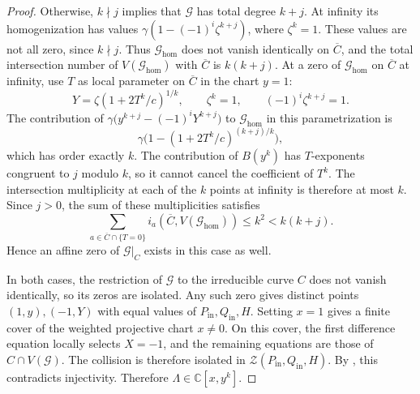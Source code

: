 \documentclass[11pt,letterpaper]{article}
\numberwithin{equation}{section}
\theoremstyle{remark}
\theoremstyle{plain}
\newcommand{\C}{\mathbb{C}}
\begin{document}
\begin{proof}
Otherwise, $k\nmid j$ implies that $\mathcal G$ has total degree $k+j$.
At infinity its homogenization has values
$\gamma(1-(-1)^i\zeta^{k+j})$, where $\zeta^k=1$.
These values are not all zero, since $k\nmid j$.
Thus $\mathcal G_{\mathrm{hom}}$ does not vanish identically on
$\overline C$, and the total intersection number of
$V(\mathcal G_{\mathrm{hom}})$ with $\overline C$ is $k(k+j)$.
At a zero of $\mathcal G_{\mathrm{hom}}$ on $\overline C$ at infinity,
use $T$ as local parameter on $\overline C$ in the chart $y=1$:
\[
 Y=\zeta(1+2T^k/c)^{1/k},\qquad
 \zeta^k=1,\qquad (-1)^i\zeta^{k+j}=1.
\]
The contribution of $\gamma\bigl(y^{k+j}-(-1)^iY^{k+j}\bigr)$
to $\mathcal G_{\mathrm{hom}}$ in this parametrization is
\[
 \gamma\bigl(1-(1+2T^k/c)^{(k+j)/k}\bigr),
\]
which has order exactly $k$.  The contribution of $B(y^k)$ has
$T$-exponents congruent to $j$ modulo $k$, so it cannot cancel
the coefficient of $T^k$.  The intersection multiplicity at each of
the $k$ points at infinity is therefore at most $k$.  Since $j>0$,
the sum of these multiplicities satisfies
\[
 \sum_{a\in\overline C\cap\{T=0\}}
 i_a(\overline C,V(\mathcal G_{\mathrm{hom}}))
 \leq k^2<k(k+j).
\]
Hence an affine zero of $\mathcal G|_C$ exists in this case as well.

In both cases, the restriction of $\mathcal G$ to the irreducible
curve $C$ does not vanish identically, so its zeros are isolated.  Any such zero
gives distinct points $(1,y),(-1,Y)$ with equal values of
$P_{\mathrm{in}},Q_{\mathrm{in}},H$.
Setting $x=1$ gives a finite cover of the weighted
projective chart $x\neq0$.  On this cover, the first difference
equation locally selects $X=-1$, and the remaining equations
are those of $C\cap V(\mathcal G)$.  The collision is therefore
isolated in $\mathcal Z(P_{\mathrm{in}},Q_{\mathrm{in}},H)$.
By , this contradicts injectivity.
Therefore $\Lambda\in\C[x,y^k]$.


\end{proof}
\end{document}
